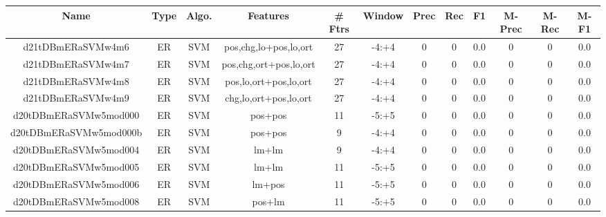 \documentclass[a4paper]{article}
\begin{document}
\begin{landscape}
\begin{center}
\begin{tabular}{ |c|c|c|c|c|c|c|c|c|c|c|c|} 
 \hline
 	Name & Type & Algo. & Features & \# Ftrs & Window & Prec & Rec & F1 & M-Prec & M-Rec & M-F1\\
 \hline

 	

 
 	
 	\small{ d21tDBmERaSVMw4m6 } & ER & SVM & pos,chg,lo+pos,lo,ort  &  27 &  -4:+4  &  0 & 0 & 0.0  &  0 & 0 & 0.0 \\
 	

 
 	
 	\small{ d21tDBmERaSVMw4m7 } & ER & SVM & pos,chg,ort+pos,lo,ort  &  27 &  -4:+4  &  0 & 0 & 0.0  &  0 & 0 & 0.0 \\
 	

 
 	
 	\small{ d21tDBmERaSVMw4m8 } & ER & SVM & pos,lo,ort+pos,lo,ort  &  27 &  -4:+4  &  0 & 0 & 0.0  &  0 & 0 & 0.0 \\
 	

 
 	
 	\small{ d21tDBmERaSVMw4m9 } & ER & SVM & chg,lo,ort+pos,lo,ort  &  27 &  -4:+4  &  0 & 0 & 0.0  &  0 & 0 & 0.0 \\
 	

 
 	
 	\small{ d20tDBmERaSVMw5mod000 } & ER & SVM & pos+pos  &  11 &  -5:+5  &  0 & 0 & 0.0  &  0 & 0 & 0.0 \\
 	

 
 	
 	\small{ d20tDBmERaSVMw5mod000b } & ER & SVM & pos+pos  &  9 &  -4:+4  &  0 & 0 & 0.0  &  0 & 0 & 0.0 \\
 	

 
 	
 	\small{ d20tDBmERaSVMw5mod004 } & ER & SVM & lm+lm  &  9 &  -4:+4  &  0 & 0 & 0.0  &  0 & 0 & 0.0 \\
 	

 
 	
 	\small{ d20tDBmERaSVMw5mod005 } & ER & SVM & lm+lm  &  11 &  -5:+5  &  0 & 0 & 0.0  &  0 & 0 & 0.0 \\
 	

 
 	
 	\small{ d20tDBmERaSVMw5mod006 } & ER & SVM & lm+pos  &  11 &  -5:+5  &  0 & 0 & 0.0  &  0 & 0 & 0.0 \\
 	

 
 	
 	\small{ d20tDBmERaSVMw5mod008 } & ER & SVM & pos+lm  &  11 &  -5:+5  &  0 & 0 & 0.0  &  0 & 0 & 0.0 \\
 	


\end{tabular}
\end{center}
\end{landscape}
\end{document}
